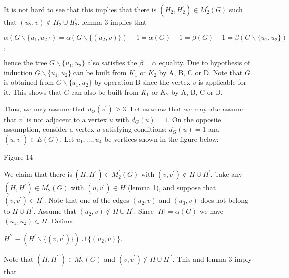 \documentclass{article}
\begin{document}
It is not hard to see that this implies that there is $(H_{2},H_{2}^{\prime
})\in M_{2}^{\prime }(G)$ such that $(u_{2},v)\notin H_{2}\cup H_{2}^{\prime
}$. lemma 3 implies that

\begin{center}
$\alpha (G\backslash \{u_{1},u_{2}\})=\alpha (G\backslash
\{(u_{2},v)\})-1=\alpha (G)-1=\beta (G)-1=\beta (G\backslash
\{u_{1},u_{2}\}) $,
\end{center}

hence the tree $G\backslash \{u_{1},u_{2}\}$ also satisfies the $\beta
=\alpha $ equality. Due to hypothesis of induction $G\backslash
\{u_{1},u_{2}\}$ can be built from $K_{1}$ or $K_{2}$ by A, B, C or D. Note
that $G$ is obtained from $G\backslash \{u_{1},u_{2}\}$ by operation B since
the vertex $v$ is applicable for it. This shows that $G$ can also be built
from $K_{1}$ or $K_{2}$ by A, B, C or D.

Thus, we may assume that $d_{G}(v^{\prime })\geq 3$. Let us show that we may
also assume that $v^{\prime }$ is not adjacent to a vertex $u$ with $d_{G}(u)=1$. On the opposite assumption, consider a vertex $u$ satisfying
conditions: $d_{G}(u)=1$ and $(u,v^{\prime })\in E(G)$. Let $u_{1},...,u_{4}$
be vertices shown in the figure below:

\begin{center}

Figure 14\bigskip
\end{center}

We claim that there is $(H,H^{\prime })\in M_{2}^{\prime }(G)$ with $(v,v^{\prime })\notin H\cup H^{\prime }$. Take any $(H,H^{\prime })\in
M_{2}^{\prime }(G)$ with $(u,v^{\prime })\in H$ (lemma 1), and suppose that $(v,v^{\prime })\in H^{\prime }$. Note that one of the edges $(u_{2},v)$ and $(u_{3},v)$ does not belong to $H\cup H^{\prime }$. Assume that $(u_{2},v)\notin H\cup H^{\prime }$. Since $\left\vert H\right\vert =\alpha
(G)$ we have $\left( u_{1},u_{2}\right) \in H$. Define:

\begin{center}
$H^{\prime \prime }\equiv (H^{\prime }\backslash \{(v,v^{\prime })\})\cup
\{(u_{2},v)\}$.
\end{center}

Note that $(H,H^{\prime \prime })\in M_{2}^{\prime }(G)$ and $(v,v^{\prime
})\notin H\cup H^{\prime \prime }$. This and lemma 3 imply that
\end{document}
